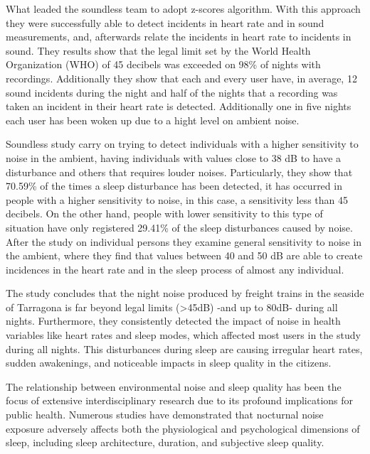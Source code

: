 What leaded the soundless team to adopt z-scores algorithm. With this approach they were successfully able to detect incidents in heart rate and in sound measurements, and, afterwards relate the incidents in heart rate to incidents in sound. They results show that the legal limit set by the World Health Organization (WHO) of 45 decibels was exceeded on 98\% of nights with recordings. Additionally they show that each and every user have, in average, 12 sound incidents during the night and half of the nights that a recording was taken an incident in their heart rate is detected. Additionally one in five nights each user has been woken up due to a hight level on ambient noise.

Soundless study carry on trying to detect individuals with a higher sensitivity to noise in the ambient, having individuals with values close to 38 dB to have a disturbance and others that requires louder noises. Particularly, they show that 70.59\% of the times a sleep disturbance has been detected, it has occurred in people with a higher sensitivity to noise, in this case, a sensitivity less than 45 decibels. On the other hand, people with lower sensitivity to this type of situation have only registered 29.41\% of the sleep disturbances caused by noise. After the study on individual persons they examine general sensitivity to noise in the ambient, where they find that values between 40 and 50 dB are able to create incidences in the heart rate and in the sleep process of almost any individual.

The study concludes that the night noise produced by freight trains in the seaside of Tarragona is far beyond legal limits (>45dB) -and up to 80dB- during all nights. Furthermore, they consistently detected the impact of noise in health variables like heart rates and sleep modes, which affected most users in the study during all nights. This disturbances during sleep are causing irregular heart rates, sudden awakenings, and noticeable impacts in sleep quality in the citizens.


The relationship between environmental noise and sleep quality has been the focus of extensive interdisciplinary research due to its profound implications for public health. Numerous studies have demonstrated that nocturnal noise exposure adversely affects both the physiological and psychological dimensions of sleep, including sleep architecture, duration, and subjective sleep quality.

